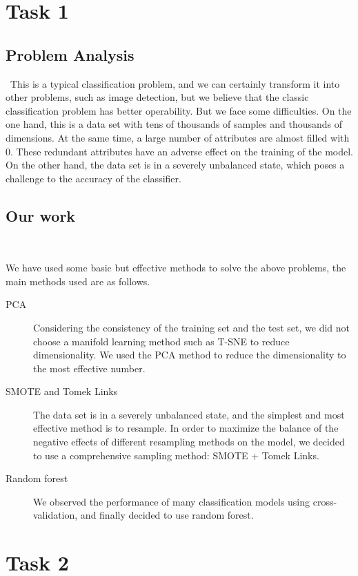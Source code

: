 
\section{Task 1}\label{sec-intro}

\subsection{Problem Analysis}
\
This is a typical classification problem, and we can certainly transform it into other problems, such as image detection, but we believe that the classic classification problem has better operability. But we face some difficulties. On the one hand, this is a data set with tens of thousands of samples and thousands of dimensions. At the same time, a large number of attributes are almost filled with 0. These redundant attributes have an adverse effect on the training of the model. On the other hand, the data set is in a severely unbalanced state, which poses a challenge to the accuracy of the classifier.

\subsection{Our work}
\

We have used some basic but effective methods to solve the above problems, the main methods used are as follows.


\begin{description}
	\item[PCA] Considering the consistency of the training set and the test set, we did not choose a manifold learning method such as T-SNE to reduce dimensionality. We used the PCA method to reduce the dimensionality to the most effective number.
	\item[SMOTE and Tomek Links] The data set is in a severely unbalanced state, and the simplest and most effective method is to resample. In order to maximize the balance of the negative effects of different resampling methods on the model, we decided to use a comprehensive sampling method: SMOTE + Tomek Links.
	\item[Random forest] We observed the performance of many classification models using cross-validation, and finally decided to use random forest.
\end{description}

\section{Task 2} \label{sec-data_exploration}

